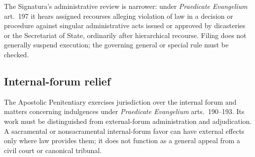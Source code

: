 The Signatura's administrative review is narrower: under \emph{Praedicate Evangelium} art.~197 it hears assigned recourses alleging violation of law in a decision or procedure against singular administrative acts issued or approved by dicasteries or the Secretariat of State, ordinarily after hierarchical recourse. Filing does not generally suspend execution; the governing general or special rule must be checked.

\subsection{Internal-forum relief}

The Apostolic Penitentiary exercises jurisdiction over the internal forum and matters concerning indulgences under \emph{Praedicate Evangelium} arts.~190--193. Its work must be distinguished from external-forum administration and adjudication. A sacramental or nonsacramental internal-forum favor can have external effects only where law provides them; it does not function as a general appeal from a civil court or canonical tribunal.
